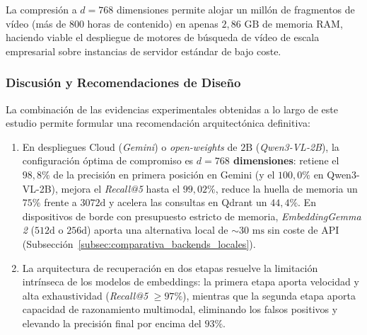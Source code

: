 La compresión a $d=768$ dimensiones permite alojar un millón de fragmentos de vídeo (más de 800 horas de contenido) en apenas $2,86\text{ GB}$ de memoria RAM, haciendo viable el despliegue de motores de búsqueda de vídeo de escala empresarial sobre instancias de servidor estándar de bajo coste.

\subsubsection{Discusión y Recomendaciones de Diseño}
La combinación de las evidencias experimentales obtenidas a lo largo de este estudio permite formular una recomendación arquitectónica definitiva:
\begin{enumerate}
    \item En despliegues Cloud (\textit{Gemini}) o \textit{open-weights} de $2\text{B}$ (\textit{Qwen3-VL-2B}), la configuración óptima de compromiso es \textbf{$d = 768$ dimensiones}: retiene el $98,8\%$ de la precisión en primera posición en Gemini (y el $100,0\%$ en Qwen3-VL-2B), mejora el \textit{Recall@5} hasta el $99,02\%$, reduce la huella de memoria un $75\%$ frente a $3072\text{d}$ y acelera las consultas en Qdrant un $44,4\%$. En dispositivos de borde con presupuesto estricto de memoria, \textit{EmbeddingGemma 2} ($512\text{d}$ o $256\text{d}$) aporta una alternativa local de $\sim 30\text{ ms}$ sin coste de API (Subsección~\ref{subsec:comparativa_backends_locales}).
    \item La arquitectura de recuperación en dos etapas resuelve la limitación intrínseca de los modelos de embeddings: la primera etapa aporta velocidad y alta exhaustividad (\textit{Recall@5} $\ge 97\%$), mientras que la segunda etapa aporta capacidad de razonamiento multimodal, eliminando los falsos positivos y elevando la precisión final por encima del $93\%$.
\end{enumerate}
